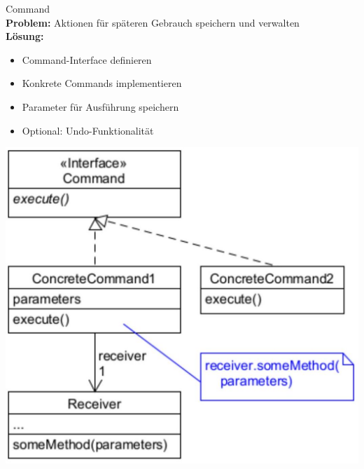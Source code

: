 \begin{concept}{Command}\\
\textbf{Problem:} Aktionen für späteren Gebrauch speichern und verwalten\\
\textbf{Lösung:}
\begin{itemize}
    \item Command-Interface definieren
    \item Konkrete Commands implementieren
    \item Parameter für Ausführung speichern
    \item Optional: Undo-Funktionalität
\end{itemize}
\includegraphics[width=0.8\linewidth]{images/2025_01_02_73d93f10fa91ab6123dcg-19}
\end{concept}



